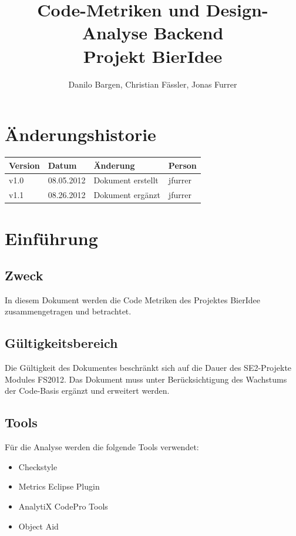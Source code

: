 \documentclass[10pt,a4paper]{scrartcl}
\author{Danilo Bargen, Christian Fässler, Jonas Furrer}
\title{Code-Metriken und Design-Analyse Backend\\ Projekt BierIdee}
\begin{document}
\begin{titlepage}
	\maketitle
	\vspace{120mm}
	\thispagestyle{empty} %
\end{titlepage}

\tableofcontents
\newpage

\section*{Änderungshistorie}
\begin{tabular}{p{}p{}p{}p{}}
\toprule
\textbf{Version} & \textbf{Datum} & \textbf{Änderung} & \textbf{Person} \\  
\midrule
v1.0 & 08.05.2012 & Dokument erstellt & jfurrer \\  
\midrule
v1.1 & 08.26.2012 & Dokument ergänzt & jfurrer \\  
\bottomrule
\end{tabular} 
\newpage

\section{Einführung}

\subsection{Zweck}
In diesem Dokument werden die Code Metriken des Projektes BierIdee zusammengetragen und betrachtet.

\subsection{Gültigkeitsbereich}
Die Gültigkeit des Dokumentes beschränkt sich auf die Dauer des SE2-Projekte Modules FS2012. Das
Dokument muss unter Berücksichtigung des Wachstums der Code-Basis ergänzt und erweitert werden.

\subsection{Tools}
Für die Analyse werden die folgende Tools verwendet:\\
\begin{itemize}
	\item Checkstyle
	\item Metrics Eclipse Plugin
	\item AnalytiX CodePro Tools
	\item Object Aid
\end{itemize}
\end{document}
